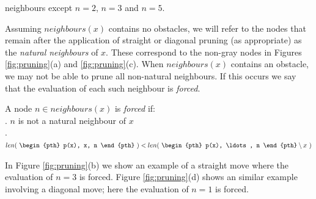 neighbours except $n = 2$, $n = 3$ and $n = 5$.  
\par
Assuming $neighbours(x)$ contains no obstacles, we will refer to the nodes
that remain after the application of straight or diagonal pruning (as
appropriate) as the \emph{natural neighbours} of $x$. These correspond to the non-gray
nodes in Figures \ref{fig:pruning}(a) and \ref{fig:pruning}(c).
When $neighbours(x)$ contains an obstacle, we may not be able to prune
all non-natural neighbours. If this occurs we say that the evaluation of each
such neighbour is \emph{forced}.

\begin{definition}
\label{def:forced}
A node $n \in neighbours(x)$ is \emph{forced} if: \\
. $n$ is not a natural neighbour of $x$\\
. $ len(~\begin{pth} p(x), x, n \end{pth}~) < len(~ \begin{pth} p(x), \ldots, n \end{pth} \setminus x~)$
\end{definition}
\par \noindent
In Figure \ref{fig:pruning}(b) we show an example of a straight move where 
the evaluation of $n = 3$ is forced. Figure \ref{fig:pruning}(d)  
shows an similar example involving a diagonal move; here the evaluation of
$n = 1$ is forced.
